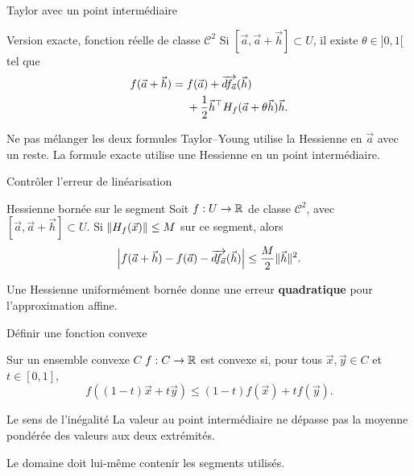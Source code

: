 \begin{frame}[t]{Taylor avec un point intermédiaire}
\coursanalyse
\begin{theoreme}{Version exacte, fonction réelle de classe $\mathcal C^2$}
Si $[\vec a,\vec a+\vec h]\subset U$, il existe $\theta\in]0,1[$ tel que
\[\begin{aligned}
f(\vec a+\vec h)={}&f(\vec a)+\overrightarrow{df_{\vec a}}(\vec h)\\
&+\frac12\vec h^\top H_f(\vec a+\theta\vec h)\vec h.
\end{aligned}\]
\end{theoreme}
\begin{resultat}{Ne pas mélanger les deux formules}
Taylor–Young utilise la Hessienne en $\vec a$ avec un reste.
La formule exacte utilise une Hessienne en un point intermédiaire.
\end{resultat}
\end{frame}

\begin{frame}[t]{Contrôler l’erreur de linéarisation}
\coursanalyse
\begin{theoreme}{Hessienne bornée sur le segment}
Soit $f:U\to\mathbb R$ de classe $\mathcal C^2$, avec $[\vec a,\vec a+\vec h]\subset U$.
Si $\lVert H_f(\vec x)\rVert\le M$ sur ce segment, alors
\[\left|f(\vec a+\vec h)-f(\vec a)-\overrightarrow{df_{\vec a}}(\vec h)\right|
\le\frac M2\lVert \vec h\rVert^2.\]
\end{theoreme}
\vfill Une Hessienne uniformément bornée donne une erreur \textbf{quadratique} pour l'approximation affine.
\end{frame}

\begin{frame}[t]{Définir une fonction convexe}
\coursanalyse
\begin{notion}{Sur un ensemble convexe $C$}
$f:C\to\mathbb R$ est convexe si, pour tous $\vec x,\vec y\in C$ et $t\in[0,1]$,
\[f((1-t)\vec x+t\vec y)\le(1-t)f(\vec x)+tf(\vec y).\]
\end{notion}
\begin{resultat}{Le sens de l’inégalité}
La valeur au point intermédiaire ne dépasse pas la moyenne pondérée des valeurs aux deux extrémités.
\end{resultat}
\vfill Le domaine doit lui-même contenir les segments utilisés.
\end{frame}

